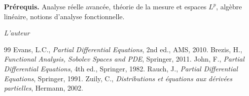 \documentclass[12pt,a4paper,twoside]{book}
\theoremstyle{definition}
\theoremstyle{plain}
\theoremstyle{remark}
\begin{document}
\medskip

\noindent\textbf{Pr\'erequis.} Analyse r\'eelle avanc\'ee, th\'eorie de la mesure et espaces $L^p$, alg\`ebre lin\'eaire, notions d'analyse fonctionnelle.

\vfill
\hfill\textit{L'auteur}


\mainmatter













\backmatter
\begin{thebibliography}{99}
 Evans, L.C., \emph{Partial Differential Equations}, 2nd ed., AMS, 2010.
 Brezis, H., \emph{Functional Analysis, Sobolev Spaces and PDE}, Springer, 2011.
 John, F., \emph{Partial Differential Equations}, 4th ed., Springer, 1982.
 Rauch, J., \emph{Partial Differential Equations}, Springer, 1991.
 Zuily, C., \emph{Distributions et \'equations aux d\'eriv\'ees partielles}, Hermann, 2002.
\end{thebibliography}
\printindex
\end{document}
